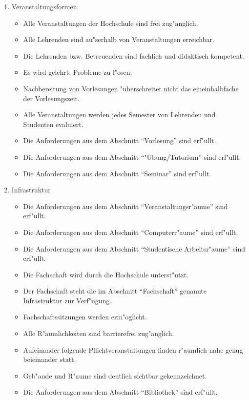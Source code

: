 \documentclass[a4paper,11pt]{article}
\begin{document}
\begin{enumerate}
\item Veranstaltungsformen
 \begin{itemize}
 \item Alle Veranstaltungen der Hochschule sind frei zug"anglich.
 \item Alle Lehrenden sind au"serhalb von Veranstaltungen erreichbar.
 \item Die Lehrenden bzw. Betreuenden sind fachlich und didaktisch kompetent.
 \item Es wird gelehrt, Probleme zu l"osen.
 \item Nachbereitung von Vorlesungen "uberschreitet nicht das eineinhalbfache der Vorlesungszeit.
 \item Alle Veranstaltungen werden jedes Semester von Lehrenden und Studenten evaluiert.
 \item Die Anforderungen aus dem Abschnitt "`Vorlesung"' sind erf"ullt.
 \item Die Anforderungen aus dem Abschnitt "`"Ubung/Tutorium"' sind erf"ullt.
 \item Die Anforderungen aus dem Abschnitt "`Seminar"' sind erf"ullt.
 \end{itemize}

\item Infrastruktur
 \begin{itemize}
 \item Die Anforderungen aus dem Abschnitt "`Veranstaltungsr"aume"' sind erf"ullt.
 \item Die Anforderungen aus dem Abschnitt "`Computerr"aume"' sind erf"ullt.
 \item Die Anforderungen aus dem Abschnitt "`Studentische Arbeitsr"aume"' sind erf"ullt.
 \item Die Fachschaft wird durch die Hochschule unterst"utzt.
 \item Der Fachschaft steht die im Abschnitt "`Fachschaft"' genannte Infrastruktur zur Verf"ugung.
 \item Fachschaftssitzungen werden erm"oglicht.
 \item Alle R"aumlichkeiten sind barrierefrei zug"anglich.
 \item Aufeinander folgende Pflichtveranstaltungen finden r"aumlich nahe genug beieinander statt.
 \item Geb"aude und R"aume sind deutlich sichtbar gekennzeichnet.
 \item Die Anforderungen aus dem Abschnitt "`Bibliothek"' sind erf"ullt.
 \end{itemize}


\end{enumerate}
\end{document}
